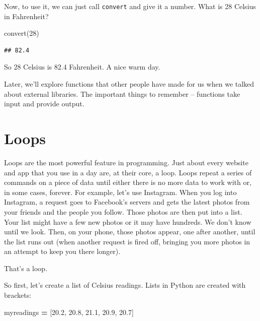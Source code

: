 \documentclass[
]{book}
\newenvironment{Shaded}{\begin{snugshade}}{\end{snugshade}}
\newcommand{\DecValTok}[1]{\textcolor[rgb]{0.00,0.00,0.81}{#1}}
\newcommand{\FloatTok}[1]{\textcolor[rgb]{0.00,0.00,0.81}{#1}}
\newcommand{\NormalTok}[1]{#1}
\newcommand{\OperatorTok}[1]{\textcolor[rgb]{0.81,0.36,0.00}{\textbf{#1}}}
\begin{document}
Now, to use it, we can just call \texttt{convert} and give it a number. What is 28 Celsius in Fahrenheit?

\begin{Shaded}
\begin{Highlighting}[]
\NormalTok{convert(}\DecValTok{28}\NormalTok{)}
\end{Highlighting}
\end{Shaded}

\begin{verbatim}
## 82.4
\end{verbatim}

So 28 Celsius is 82.4 Fahrenheit. A nice warm day.

Later, we'll explore functions that other people have made for us when we talked about external libraries. The important things to remember -- functions take input and provide output.

\hypertarget{loops}{%
\section{Loops}\label{loops}}

Loops are the most powerful feature in programming. Just about every website and app that you use in a day are, at their core, a loop. Loops repeat a series of commands on a piece of data until either there is no more data to work with or, in some cases, forever. For example, let's use Instagram. When you log into Instagram, a request goes to Facebook's servers and gets the latest photos from your friends and the people you follow. Those photos are then put into a list. Your list might have a few new photos or it may have hundreds. We don't know until we look. Then, on your phone, those photos appear, one after another, until the list runs out (when another request is fired off, bringing you more photos in an attempt to keep you there longer).

That's a loop.

So first, let's create a list of Celsius readings. Lists in Python are created with brackets:

\begin{Shaded}
\begin{Highlighting}[]
\NormalTok{myreadings }\OperatorTok{=}\NormalTok{ [}\FloatTok{20.2}\NormalTok{, }\FloatTok{20.8}\NormalTok{, }\FloatTok{21.1}\NormalTok{, }\FloatTok{20.9}\NormalTok{, }\FloatTok{20.7}\NormalTok{]}
\end{Highlighting}
\end{Shaded}
\end{document}
